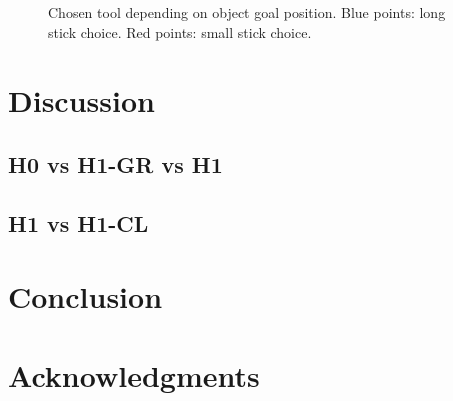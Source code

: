 \documentclass[10pt,letterpaper]{article}
\begin{document}
	\begin{figure}[ht]
		\caption{Chosen tool depending on object goal position. Blue points: long stick choice. Red points: small stick choice.}
		\label{res_choice}
	\end{figure}
	
%


\section{Discussion}

	\subsection{H0 vs H1-GR vs H1}
	
	
	
	\subsection{H1 vs H1-CL}
	
	
	
%


\section{Conclusion}

%


\section{Acknowledgments}

%






\setlength{\bibleftmargin}{.125in}
\setlength{\bibindent}{-\bibleftmargin}


\end{document}
